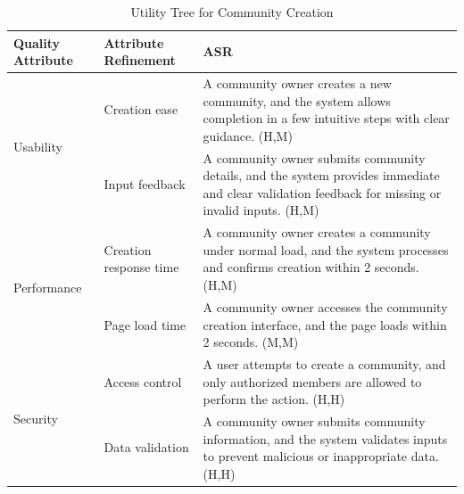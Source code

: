 \documentclass{article}
\begin{document}
\begin{table}[H]
    \centering
    \caption{Utility Tree for Community Creation}
    \begin{tabular}{|p{3cm}|p{4cm}|p{7cm}|}
        \hline
        \textbf{Quality Attribute} & \textbf{Attribute Refinement}                                                                                                                     & \textbf{ASR} \\
        \hline

        \multirow{2}{*}{Usability}
                                   & Creation ease
                                   & A community owner creates a new community, and the system allows completion in a few intuitive steps with clear guidance. (H,M)                                  \\
        \cline{2-3}
                                   & Input feedback
                                   & A community owner submits community details, and the system provides immediate and clear validation feedback for missing or invalid inputs. (H,M)                \\
        \hline

        \multirow{2}{*}{Performance}
                                   & Creation response time
                                   & A community owner creates a community under normal load, and the system processes and confirms creation within 2 seconds. (H,M)                                  \\
        \cline{2-3}
                                   & Page load time
                                   & A community owner accesses the community creation interface, and the page loads within 2 seconds. (M,M)                                                          \\
        \hline

        \multirow{2}{*}{Security}
                                   & Access control
                                   & A user attempts to create a community, and only authorized members are allowed to perform the action. (H,H)                                                      \\
        \cline{2-3}
                                   & Data validation
                                   & A community owner submits community information, and the system validates inputs to prevent malicious or inappropriate data. (H,H)                               \\
        \hline


\end{tabular}
\end{table}
\end{document}
